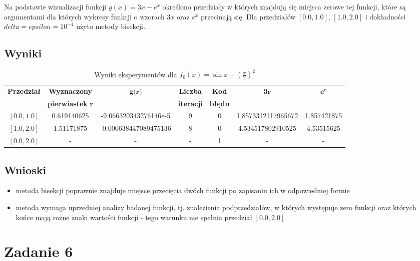\documentclass{article}
\begin{document}
Na podstawie wizualizacji funkcji $g(x) = 3x - e^x$ określono przedziały w których znajdują się miejsca zerowe tej funkcji, 
które są argumentami dla których wykresy funkcji o wzorach $3x$ oraz $e^x$ przecinają się.  \newline
Dla przedziałów $[0.0, 1.0]$, $[1.0, 2.0]$ i dokładności $delta = epsilon = 10^{-4}$ użyto metody bisekcji.

\subsection{Wyniki}
\begin{table}[h!]
    \centering
    \begin{tabular}{|c|c|c|c|c|c|c|}
    \hline
    \multirow{2}{*}{\textbf{Przedział}} & \textbf{Wyznaczony} & \multirow{2}{*}{$\textbf{g(r)}$} & \textbf{Liczba} & \textbf{Kod} & \multirow{2}{*}{$\textbf{3r}$} & \multirow{2}{*}{$\textbf{e}^\textbf{r}$} \\
    & \textbf{pierwiastek} $\textbf{r}$ & & \textbf{iteracji} & \textbf{błędu} & & \\
    \hline
    $[0.0, 1.0]$ & 0.619140625 & -9.066320343276146e-5 & 9 & 0 & 1.8573312117965672 & 1.857421875 \\
    \hline
    $[1.0, 2.0]$ & 1.51171875 & -0.000638447089475136 & 8 & 0 & 4.534517802910525 & 4.53515625 \\
    \hline
    $[0.0, 2.0]$ & - & - & - & 1 & - & - \\
    \hline
    \end{tabular}
    \caption{Wyniki eksperymentów dla $f_0(x) = \sin{x} - (\frac{x}{2})^2$}
\end{table}

\subsection{Wnioski}
\begin{itemize}
    \item metoda bisekcji poprawnie znajduje miejsce przecięcia dwóch funkcji po zapisaniu ich w odpowiedniej formie
    \item metoda wymaga uprzedniej analizy badanej funkcji, tj. znalezienia podprzedziałów, w których występuje zero funkcji 
    oraz których końce mają rożne znaki wartości funkcji - tego warunku nie spełnia przedział $[0.0, 2.0]$
\end{itemize}

\newpage

\section{Zadanie 6}
\end{document}
